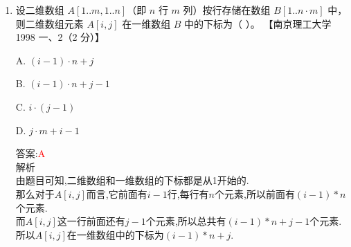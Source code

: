 \documentclass[lang=cn,newtx,10pt,scheme=chinese]{../elegantbook}
\begin{document}
\begin{enumerate}
    (2) $A$ 的第 8 列和第 5 行共占（ ）个字节；\\
    第8列的元素有9个,第5行的元素有10个,\\
    所以总共的元素为$9+10=19$.\\
    而每个元素占6个字符,所以总共需要$19*6=114$个字符.\\

    (3) 若 $A$ 按行存放，元素 $A[8,5]$ 的起始地址与 $A$ 按列存放时的元素（ ）的起始地址一致。\\
    首先,我们来看按行存放的情况:\\
    $A[8,5]$前面有8行,每行有10个元素,所以前面有$8*10=80$个元素.\\
    而$A[8,5]$这一行前面还有4个元素,所以总共有$80+4=84$个元素.\\
    那么$A[8,5]$就是第85个元素.\\
    现在我们就是要找到第85个元素在按列存放时的位置.\\
    一列有9个元素,前9列共有$9*9=81$个元素.\\
    所以第85个元素在第10列,在第10列中,它是第4个元素.\\
    所以对应的列下标为$3$.\\
    对应的答案即为$A[3,10]$.\\
    
    
    
    
    
    
    
    
    \item 设二维数组 $A[1..m, 1..n]$（即 $n$ 行 $m$ 列）按行存储在数组 $B[1..n \cdot m]$ 中，则二维数组元素 $A[i,j]$ 在一维数组 $B$ 中的下标为（ ）。  
    【南京理工大学 1998 一、2（2 分）】  

    A. $(i-1) \cdot n + j$  

    B. $(i-1) \cdot n + j - 1$  

    C. $i \cdot (j - 1)$  

    D. $j \cdot m + i - 1$  

    答案:\textcolor{red}{A}\\
    解析\\
    由题目可知,二维数组和一维数组的下标都是从1开始的.\\
    那么对于$A[i,j]$而言,它前面有$i-1$行,每行有$n$个元素,所以前面有$(i-1)*n$个元素.\\
    而$A[i,j]$这一行前面还有$j-1$个元素,所以总共有$(i-1)*n+j-1$个元素.\\
    所以$A[i,j]$在一维数组中的下标为$(i-1)*n+j$.\\
    


\end{enumerate}
\end{document}
